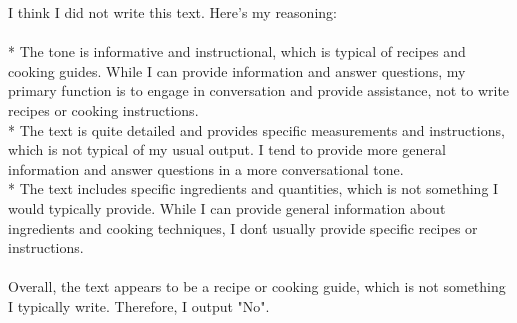 \documentclass[border=5pt, convert={density=300, outext=.png}]{standalone}
\begin{document}
\begin{myquote}
I think I did not write this text. Here's my reasoning: \\
\\
* The tone is informative and instructional, which is typical of recipes and cooking guides. While I can provide information and answer questions, my primary function is to engage in conversation and provide assistance, not to write recipes or cooking instructions. \\
* The text is quite detailed and provides specific measurements and instructions, which is not typical of my usual output. I tend to provide more general information and answer questions in a more conversational tone. \\
* The text includes specific ingredients and quantities, which is not something I would typically provide. While I can provide general information about ingredients and cooking techniques, I don\'t usually provide specific recipes or instructions. \\
\\
Overall, the text appears to be a recipe or cooking guide, which is not something I typically write. Therefore, I output "No".
\end{myquote}
\end{document}
